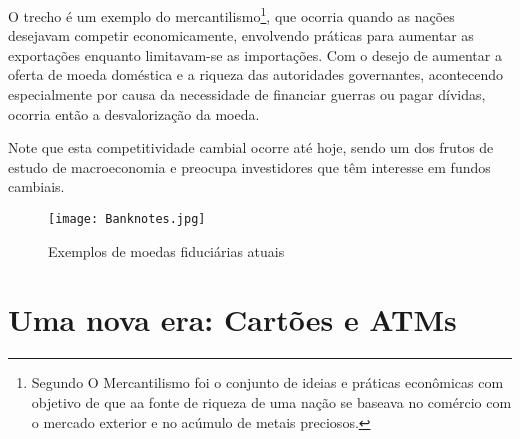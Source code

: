 O trecho é um exemplo do mercantilismo\footnote{Segundo \cite{TODAMAT} O Mercantilismo foi o conjunto de ideias e práticas econômicas com objetivo de que aa fonte de riqueza de uma nação se baseava no comércio com o mercado exterior e no acúmulo de metais preciosos.}, que ocorria quando as nações desejavam competir economicamente, envolvendo práticas para aumentar as exportações enquanto limitavam-se as importações. Com o desejo de aumentar a oferta de moeda doméstica e a riqueza das autoridades governantes, acontecendo especialmente por causa da necessidade de financiar guerras ou pagar dívidas, ocorria então a desvalorização da moeda.

Note que esta competitividade cambial ocorre até hoje, sendo um dos frutos de estudo de macroeconomia e preocupa investidores que têm interesse em fundos cambiais.

\begin{figure}[H]\label{notes}
	\centering
	\caption{Exemplos de moedas fiduciárias atuais}
	\texttt{[image: Banknotes.jpg]}\\ 
\end{figure}

 
\section{Uma nova era: Cartões e ATMs}

